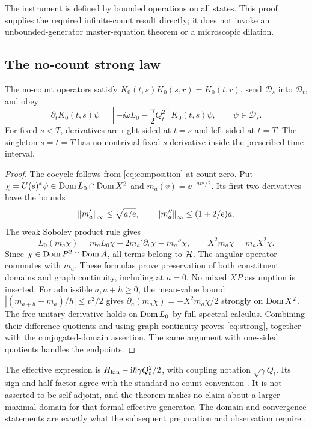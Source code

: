 The instrument is defined by bounded operations on all states. This proof
supplies the required infinite-count result directly; it does not invoke an
unbounded-generator master-equation theorem or a microscopic dilation.

\subsection{The no-count strong law}
\begin{theorem}\label{thm:strong}
The no-count operators satisfy $K_0(t,s)K_0(s,r)=K_0(t,r)$, send
$\mathcal D_s$ into $\mathcal D_t$, and obey
\begin{equation}\label{eq:strong}
 \partial_tK_0(t,s)\psi=
 \left[-\ii\omega L_0-\frac\gamma2Q_t^2\right]K_0(t,s)\psi,
 \qquad\psi\in\mathcal D_s.
\end{equation}
For fixed $s<T$, derivatives are right-sided at $t=s$ and left-sided at
$t=T$. The singleton $s=t=T$ has no nontrivial fixed-$s$ derivative
inside the prescribed time interval.
\end{theorem}
\begin{proof}
The cocycle follows from \eqref{eq:composition} at count zero. Put
$\chi=U(s)^*\psi\in\operatorname{Dom} L_0\cap\operatorname{Dom} X^2$ and
$m_a(v)=\ee^{-av^2/2}$. Its first two derivatives have the bounds
\[
 \left\lVert m_a'\right\rVert_\infty\le\sqrt{a/\mathrm e},\qquad
 \left\lVert m_a''\right\rVert_\infty\le(1+2/\mathrm e)a.
\]
The weak Sobolev product rule gives
\begin{equation}\label{eq:product}
 L_0(m_a\chi)=m_aL_0\chi-2m_a'\partial_v\chi-m_a''\chi,
 \qquad X^2m_a\chi=m_aX^2\chi.
\end{equation}
Since $\chi\in\operatorname{Dom} P^2\cap\operatorname{Dom} A$, all terms belong to $\mathcal H$.
The angular operator commutes with $m_a$. These formulas prove preservation
of both constituent domains and graph continuity, including at $a=0$.
No mixed $XP$ assumption is inserted.
For admissible $a,a+h\ge0$, the mean-value bound
$|(m_{a+h}-m_a)/h|\le v^2/2$ gives
$\partial_a(m_a\chi)=-X^2m_a\chi/2$ strongly on $\operatorname{Dom} X^2$.
The free-unitary derivative holds on $\operatorname{Dom} L_0$ by full spectral calculus.
Combining their difference quotients and using graph continuity proves
\eqref{eq:strong}, together with the conjugated-domain assertion.
The same argument with one-sided quotients handles the endpoints.
\end{proof}

The effective expression is
$H_{\rm kin}-\mathrm i\hbar\gamma Q_t^2/2$, with coupling notation
$\sqrt\gamma Q_t$. Its sign and half factor agree with the standard
no-count convention \cite[Section 1, (4)--(11)]{CastinDalibardMolmer2008v1}.
It is not asserted to be self-adjoint, and the theorem makes no claim about
a larger maximal domain for that formal effective generator. The domain
and convergence statements are exactly what the subsequent preparation
and observation require \cite[Section 4]{TNDDirect}.
